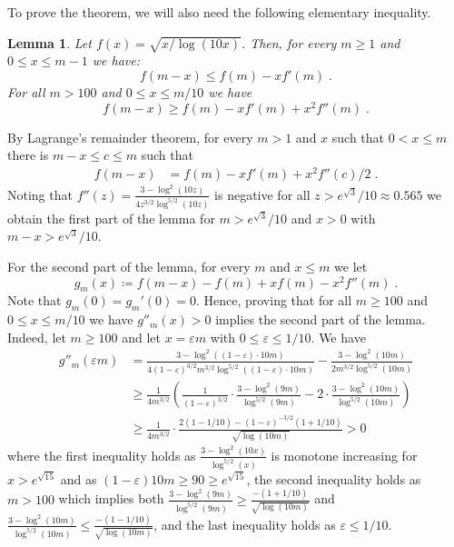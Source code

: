 \documentclass[11pt]{article}
\makeatletter
\theoremstyle{plain}
\newtheorem{lemma}[theorem]{Lemma}
\renewenvironment{proof}[1][\proofname]
{\par\pushQED{\qed}
	\normalfont\topsep6\p@\@plus6\p@\relax\trivlist
	\item[\hskip\labelsep\bfseries#1\@addpunct{.}]
	\ignorespaces}
{\popQED\endtrivlist\@endpefalse}
\makeatother
\begin{document}
To prove the theorem, we will also need the following elementary inequality.

\begin{lemma}\label{lem:Taylor_series}
    Let $f(x)=\sqrt{x/\log(10x)}$. Then, for every $m\geq 1$ and $0\leq x\leq m-1$ we have:
    \[
        f(m-x)\leq f(m)-xf'(m)\;.
    \]
    For all $m>100$ and $0\leq x\leq m/10$ we have
    \[
        f(m-x)\geq f(m)-xf'(m)+x^2f''(m)\;.
    \]
\end{lemma}


\begin{proof}
By Lagrange's remainder theorem, for every $m>1$ and $x$ such that $0< x\leq m$ there is $m-x\leq c\leq m$ such that
\begin{align*}
    f(m-x)&=f(m)- xf'(m)+x^2f''(c)/2\;.
\end{align*}
Noting that $f''(z)=\frac{3-\log^2(10z)}{4z^{3/2}\log^{5/2}(10z)}$ is negative for all $z>e^{\sqrt{3}}/10 \approx 0.565$ we obtain the first part of the lemma for $m>e^{\sqrt{3}}/10$ and $x>0$ with $m-x>e^{\sqrt{3}}/10$.

For the second part of the lemma, for every $m$ and $x\leq m$ we let
\[
    g_m(x)\coloneqq f(m-x)-f(m)+xf(m)-x^2f''(m)\;.
\]
Note that $g_m(0)=g_m'(0)=0$. Hence, proving that for all $m\geq 100$ and $0\leq x\leq m/10$ we have $g''_m(x)>0$ implies the second part of the lemma.
Indeed, let $m\geq 100$ and let $x=\varepsilon m $ with $0\leq \varepsilon\leq 1/10$. We have
\begin{align*}
    g''_m(\varepsilon m)&=\frac{3-\log^2((1-\varepsilon)\cdot 10m)}{4(1-\varepsilon)^{3/2}m^{3/2}\log^{5/2}((1-\varepsilon)\cdot 10m)}-\frac{3-\log^2(10m)}{2m^{3/2}\log^{5/2}(10m)}\\
    &\geq \frac{1}{4m^{3/2}}\left(\frac{1}{(1-\varepsilon)^{3/2}}\cdot \frac{3-\log^{2}(9m)}{\log^{5/2}(9m)}- 2\cdot \frac{3-\log^{2}(10m)}{\log^{5/2}(10m)}\right)\\
    &\geq \frac{1}{4m^{3/2}}\cdot {\frac{2(1-1/10)-(1-\varepsilon)^{-3/2}(1+1/10)}{\sqrt{\log(10m)}}}>0
\end{align*}
where the first inequality holds as $\frac{3-\log^2(10x)}{\log^{5/2}(x)}$ is monotone increasing for $x>e^{\sqrt{15}}$ and as $(1-\varepsilon)10 m\geq 90\geq e^{\sqrt{15}}$, the second inequality holds as $m>100$ which implies both $\frac{3-\log^2(9m)}{\log^{5/2}(9m)}\geq \frac{-(1+1/10)}{\sqrt{\log(10m)}}$ and $\frac{3-\log^2{(10m)}}{\log^{5/2}(10m)}\leq \frac{-(1-1/10)}{\sqrt{\log(10m)}}$, and the last inequality holds as $\varepsilon\leq 1/10$.
\end{proof}
\end{document}
